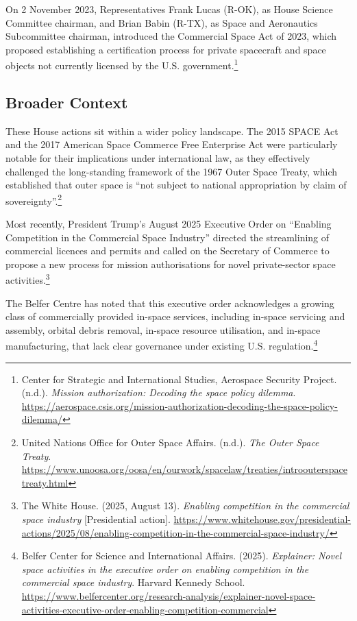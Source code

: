 On 2 November 2023, Representatives Frank Lucas (R-OK), as House Science Committee chairman, and Brian Babin (R-TX), as Space and Aeronautics Subcommittee chairman, introduced the Commercial Space Act of 2023, which proposed establishing a certification process for private spacecraft and space objects not currently licensed by the U.S. government.\footnote{Center for Strategic and International Studies, Aerospace Security Project. (n.d.). \emph{Mission authorization: Decoding the space policy dilemma}. \url{https://aerospace.csis.org/mission-authorization-decoding-the-space-policy-dilemma/}}

\subsection{Broader Context}

These House actions sit within a wider policy landscape. The 2015 SPACE Act and the 2017 American Space Commerce Free Enterprise Act were particularly notable for their implications under international law, as they effectively challenged the long-standing framework of the 1967 Outer Space Treaty, which established that outer space is “not subject to national appropriation by claim of sovereignty”.\footnote{United Nations Office for Outer Space Affairs. (n.d.). \emph{The Outer Space Treaty}. \url{https://www.unoosa.org/oosa/en/ourwork/spacelaw/treaties/introouterspacetreaty.html}}

Most recently, President Trump’s August 2025 Executive Order on “Enabling Competition in the Commercial Space Industry” directed the streamlining of commercial licences and permits and called on the Secretary of Commerce to propose a new process for mission authorisations for novel private-sector space activities.\footnote{The White House. (2025, August 13). \emph{Enabling competition in the commercial space industry} [Presidential action]. \url{https://www.whitehouse.gov/presidential-actions/2025/08/enabling-competition-in-the-commercial-space-industry/}}

The Belfer Centre has noted that this executive order acknowledges a growing class of commercially provided in-space services, including in-space servicing and assembly, orbital debris removal, in-space resource utilisation, and in-space manufacturing, that lack clear governance under existing U.S. regulation.\footnote{Belfer Center for Science and International Affairs. (2025). \emph{Explainer: Novel space activities in the executive order on enabling competition in the commercial space industry}. Harvard Kennedy School. \url{https://www.belfercenter.org/research-analysis/explainer-novel-space-activities-executive-order-enabling-competition-commercial}}
